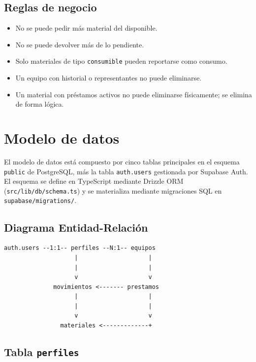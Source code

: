 \documentclass[12pt,a4paper,oneside]{report}
\newcommand{\file}[1]{\texttt{\color{cecyteDark}#1}}
\begin{document}
\section{Reglas de negocio}

\begin{itemize}
  \item No se puede pedir más material del disponible.
  \item No se puede devolver más de lo pendiente.
  \item Solo materiales de tipo \file{consumible} pueden reportarse como consumo.
  \item Un equipo con historial o representantes no puede eliminarse.
  \item Un material con préstamos activos no puede eliminarse físicamente; se elimina de forma lógica.
\end{itemize}

\chapter{Modelo de datos}

El modelo de datos está compuesto por cinco tablas principales en el esquema \file{public} de PostgreSQL, más la tabla \file{auth.users} gestionada por Supabase Auth. El esquema se define en TypeScript mediante Drizzle ORM (\file{src/lib/db/schema.ts}) y se materializa mediante migraciones SQL en \file{supabase/migrations/}.

\section{Diagrama Entidad-Relación}

\begin{verbatim}
auth.users --1:1-- perfiles --N:1-- equipos
                    |                    |
                    |                    |
                    v                    v
              movimientos <------- prestamos
                    |                    |
                    |                    |
                    v                    v
                materiales <-------------+
\end{verbatim}

\section{Tabla \texttt{perfiles}}
\end{document}
